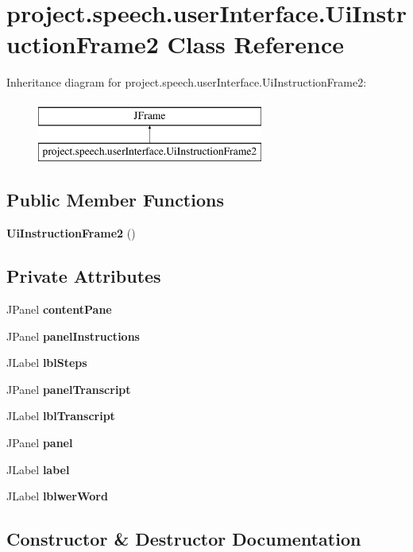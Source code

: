 \section{project.\+speech.\+user\+Interface.\+Ui\+Instruction\+Frame2 Class Reference}
\label{classproject_1_1speech_1_1user_interface_1_1_ui_instruction_frame2}
Inheritance diagram for project.\+speech.\+user\+Interface.\+Ui\+Instruction\+Frame2\+:\begin{figure}[H]
\begin{center}
\leavevmode
\includegraphics[height=2.000000cm]{classproject_1_1speech_1_1user_interface_1_1_ui_instruction_frame2}
\end{center}
\end{figure}
\subsection*{Public Member Functions}
\begin{DoxyCompactItemize}
\item 
{\bf Ui\+Instruction\+Frame2} ()
\end{DoxyCompactItemize}
\subsection*{Private Attributes}
\begin{DoxyCompactItemize}
\item 
J\+Panel {\bf content\+Pane}
\item 
J\+Panel {\bf panel\+Instructions}
\item 
J\+Label {\bf lbl\+Steps}
\item 
J\+Panel {\bf panel\+Transcript}
\item 
J\+Label {\bf lbl\+Transcript}
\item 
J\+Panel {\bf panel}
\item 
J\+Label {\bf label}
\item 
J\+Label {\bf lblwer\+Word}
\end{DoxyCompactItemize}


\subsection{Constructor \& Destructor Documentation}
